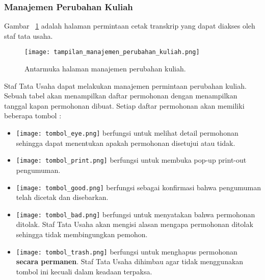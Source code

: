 \subsubsection{Manajemen Perubahan Kuliah}
\noindent Gambar ~\ref{fig:tampilanManajemenPerubahanKuliah} adalah halaman permintaan cetak transkrip yang dapat diakses oleh staf tata usaha.
\begin{figure} [H]
	\centering  
	\texttt{[image: tampilan\_manajemen\_perubahan\_kuliah.png]} 
	\caption{Antarmuka halaman manajemen perubahan kuliah.} 
	\label{fig:tampilanManajemenPerubahanKuliah}
\end{figure}
Staf Tata Usaha dapat melakukan manajemen permintaan perubahan kuliah. Sebuah tabel akan menampilkan daftar permohonan dengan menampilkan tanggal kapan permohonan dibuat.
Setiap daftar permohonan akan memiliki beberapa tombol :

\begin{itemize}
	\item \texttt{[image: tombol\_eye.png]} berfungsi untuk melihat detail permohonan sehingga dapat menentukan apakah permohonan disetujui atau tidak.
	\item \texttt{[image: tombol\_print.png]} berfungsi untuk membuka pop-up print-out pengumuman.
	\item \texttt{[image: tombol\_good.png]} berfungsi sebagai konfirmasi bahwa pengumuman telah dicetak dan disebarkan.
	\item \texttt{[image: tombol\_bad.png]} berfungsi untuk menyatakan bahwa permohonan ditolak. Staf Tata Usaha akan mengisi alasan mengapa permohonan ditolak sehingga tidak membingungkan pemohon.
	\item \texttt{[image: tombol\_trash.png]} berfungsi untuk menghapus permohonan \textbf{secara permanen}. Staf Tata Usaha dihimbau agar tidak menggunakan tombol ini kecuali dalam keadaan terpaksa.
\end{itemize}

